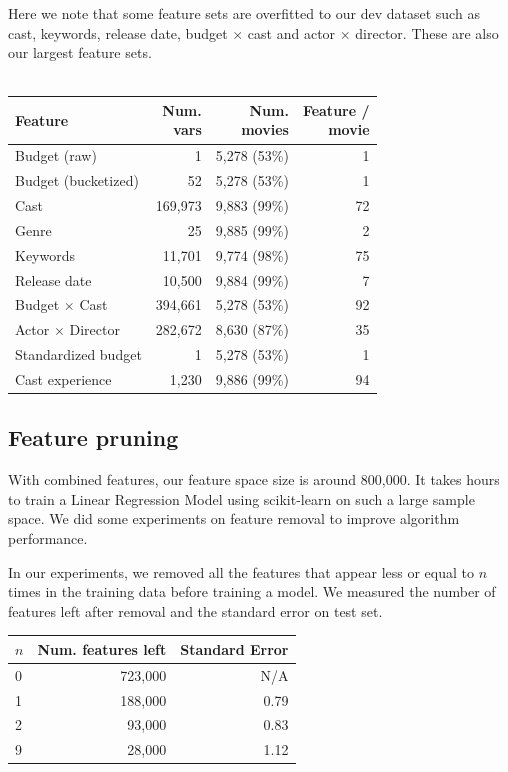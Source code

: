 \documentclass[journal]{IEEEtran}
\begin{document}
\par Here we note that some feature sets are overfitted to our dev dataset such as
cast, keywords, release date, budget $\times$ cast and actor $\times$ director.
These are also our largest feature sets.\\
\\
\begin{tabular}{|l| r r r|} %
\hline
Feature             & \shortstack[c]{Num.\\vars} & \shortstack[c]{Num.\\movies} & \shortstack[c]{Feature / \\ movie}  \\ [0.5ex] %
\hline
Budget (raw)        & 1 & 5,278 (53\%) & 1 \\ %
Budget (bucketized) & 52 & 5,278 (53\%) & 1 \\
Cast                & 169,973 & 9,883 (99\%) & 72 \\
Genre               & 25 & 9,885 (99\%) & 2 \\
Keywords            & 11,701 & 9,774 (98\%) & 75 \\
Release date        & 10,500 & 9,884 (99\%) & 7 \\
\hline
Budget $\times$ Cast & 394,661 & 5,278 (53\%) & 92 \\
Actor $\times$ Director & 282,672 & 8,630 (87\%) & 35 \\
\hline
Standardized budget & 1 & 5,278 (53\%) & 1 \\
Cast experience & 1,230 & 9,886 (99\%) & 94 \\
\hline %
\end{tabular}

\subsection{Feature pruning}
With combined features, our feature space size is around 800,000. It takes hours to train a Linear Regression Model using scikit-learn \cite{scikit} on such a large sample space. We did some experiments on feature removal to improve algorithm performance.
\par In our experiments, we removed all the features that appear less or equal to $n$ times in the training data before training a model. We measured the number of features left after removal and the standard error on test set.\\
\begin{center}
\begin{tabular}{|l| r r|} %
\hline
$n$ & Num. features left & Standard Error  \\ [0.5ex] %
\hline
0 & 723,000 & N/A \\
1 & 188,000 & 0.79 \\
2 & 93,000  & 0.83 \\
9 & 28,000  & 1.12 \\
\hline %
\end{tabular}
\end{center}
\smallskip
\end{document}

